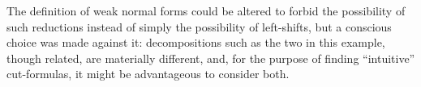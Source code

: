 \documentclass[a4paper, 11pt]{report}
\begin{document}
The definition of weak normal forms could be altered to forbid the possibility of such reductions instead of simply the possibility of left-shifts, but a conscious choice was made against it: decompositions such as the two in this example, though related, are materially different, and, for the purpose of finding ``intuitive'' cut-formulas, it might be advantageous to consider both.



\end{document}
